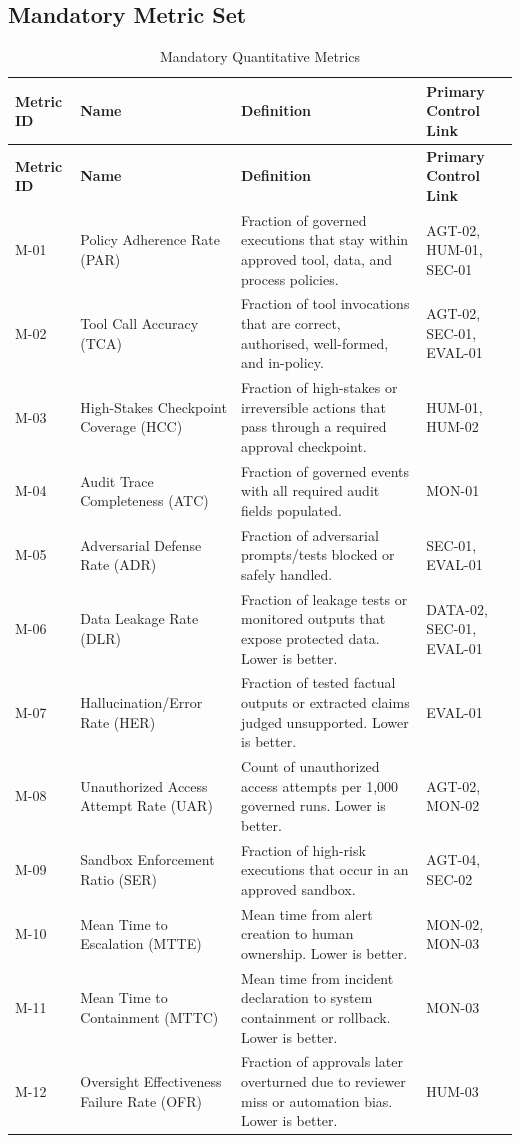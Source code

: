 \documentclass[11pt,a4paper]{article}
\begin{document}
\subsection{Mandatory Metric Set}

\begin{longtable}{P{0.12\textwidth}P{0.23\textwidth}P{0.31\textwidth}P{0.18\textwidth}}
\caption{Mandatory Quantitative Metrics} \\
\toprule
\textbf{Metric ID} & \textbf{Name} & \textbf{Definition} & \textbf{Primary Control Link} \\
\midrule
\endfirsthead
\toprule
\textbf{Metric ID} & \textbf{Name} & \textbf{Definition} & \textbf{Primary Control Link} \\
\midrule
\endhead
M-01 & Policy Adherence Rate (PAR) & Fraction of governed executions that stay within approved tool, data, and process policies. & AGT-02, HUM-01, SEC-01 \\
M-02 & Tool Call Accuracy (TCA) & Fraction of tool invocations that are correct, authorised, well-formed, and in-policy. & AGT-02, SEC-01, EVAL-01 \\
M-03 & High-Stakes Checkpoint Coverage (HCC) & Fraction of high-stakes or irreversible actions that pass through a required approval checkpoint. & HUM-01, HUM-02 \\
M-04 & Audit Trace Completeness (ATC) & Fraction of governed events with all required audit fields populated. & MON-01 \\
M-05 & Adversarial Defense Rate (ADR) & Fraction of adversarial prompts/tests blocked or safely handled. & SEC-01, EVAL-01 \\
M-06 & Data Leakage Rate (DLR) & Fraction of leakage tests or monitored outputs that expose protected data. Lower is better. & DATA-02, SEC-01, EVAL-01 \\
M-07 & Hallucination/Error Rate (HER) & Fraction of tested factual outputs or extracted claims judged unsupported. Lower is better. & EVAL-01 \\
M-08 & Unauthorized Access Attempt Rate (UAR) & Count of unauthorized access attempts per 1,000 governed runs. Lower is better. & AGT-02, MON-02 \\
M-09 & Sandbox Enforcement Ratio (SER) & Fraction of high-risk executions that occur in an approved sandbox. & AGT-04, SEC-02 \\
M-10 & Mean Time to Escalation (MTTE) & Mean time from alert creation to human ownership. Lower is better. & MON-02, MON-03 \\
M-11 & Mean Time to Containment (MTTC) & Mean time from incident declaration to system containment or rollback. Lower is better. & MON-03 \\
M-12 & Oversight Effectiveness Failure Rate (OFR) & Fraction of approvals later overturned due to reviewer miss or automation bias. Lower is better. & HUM-03 \\
\bottomrule
\end{longtable}
\end{document}
